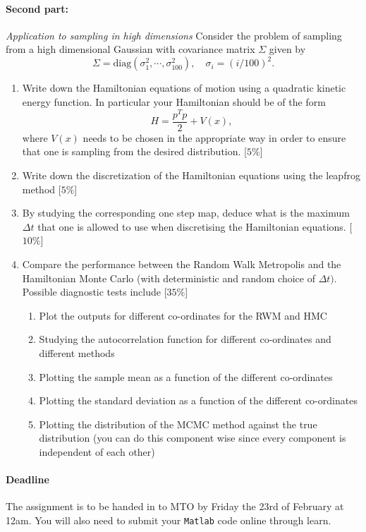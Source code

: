 \documentclass{scrartcl}
\begin{document}
\paragraph{Second part:} \emph{Application to sampling in high dimensions}
\newline
Consider the problem of sampling from a high dimensional Gaussian with  covariance matrix $\Sigma$ given by 
\[
\Sigma =\text{diag} (\sigma^{2}_{1}, \cdots, \sigma^{2}_{100}), \quad  \sigma_{i}=(i/100)^{2}.
\]
\begin{enumerate}
\item Write down the Hamiltonian equations of motion using a quadratic kinetic energy function. In particular your Hamiltonian should be of the form  
\[
H=\frac{p^{T}p}{2}+V(x),
\]
where $V(x)$ needs to be chosen in the appropriate way in order to ensure that one is sampling from the desired distribution.  \hfill [$5 \%$]
\item Write down the discretization of the Hamiltonian equations using the leapfrog method \hfill [$5 \%$]
\item By studying the corresponding one step map, deduce what is the maximum  $\Delta t$  that one is allowed to use when discretising the Hamiltonian equations. \hfill [$10\%$]
\item Compare the performance between the Random Walk Metropolis and the Hamiltonian Monte Carlo (with deterministic and random choice of $\Delta t)$. Possible  diagnostic tests include \hfill [$35 \%$]
\begin{enumerate}
\item Plot the outputs for different co-ordinates for the RWM and HMC
\item Studying the autocorrelation function for different co-ordinates and different methods
\item Plotting the sample mean as a function of the different co-ordinates 
\item Plotting the standard deviation as a function of the different co-ordinates
\item Plotting the distribution of the MCMC method against the true distribution (you can do this component wise since every component is independent of each other)
\end{enumerate}
\end{enumerate}






\paragraph{Deadline} The assignment is to be handed in to MTO by Friday the 23rd of February at 12am. You will also 
need to submit your  \texttt{Matlab} code online through learn. 



 







	
    
\end{document}
